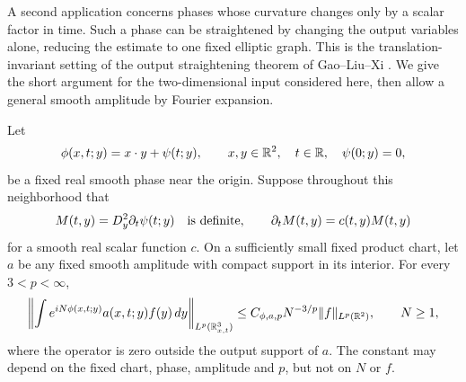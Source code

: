 A second application concerns phases whose curvature changes only by
a scalar factor in time. Such a phase can be straightened by changing
the output variables alone, reducing the estimate to one fixed
elliptic graph. This is the translation-invariant setting of the output
straightening theorem of Gao--Liu--Xi
\cite[Theorem~1.12 and Section~4.1]{GaoLiuXi2025}.
We give the short argument for the two-dimensional input considered
here, then allow a general smooth amplitude by Fourier expansion.

\begin{corollary}
\label{cor:bourgain-oscillatory}
Let
\[
 \phi(x,t;y)=x\cdot y+\psi(t;y),\qquad
 x,y\in\mathbb R^2,\quad t\in\mathbb R,\quad \psi(0;y)=0,
\]
be a fixed real smooth phase near the origin. Suppose throughout
this neighborhood that
\[
 M(t,y)=D_y^2\partial_t\psi(t;y)\quad\hbox{is definite},
 \qquad \partial_tM(t,y)=c(t,y)M(t,y)
\]
for a smooth real scalar function \(c\). On a sufficiently small
fixed product chart, let \(a\) be any fixed smooth amplitude with
compact support in its interior. For every \(3<p<\infty\),
\begin{equation}\label{eq:bourgain-oscillatory}
 \left\|\int e^{iN\phi(x,t;y)}a(x,t;y)f(y)\,d y
       \right\|_{L^p(\mathbb R^3_{x,t})}
 \le C_{\phi,a,p}N^{-3/p}\|f\|_{L^p(\mathbb R^2)},\qquad N\ge1,
\end{equation}
where the operator is zero outside the output support of \(a\).
The constant may depend on the fixed chart, phase, amplitude and
\(p\), but not on \(N\) or \(f\).
\end{corollary}

